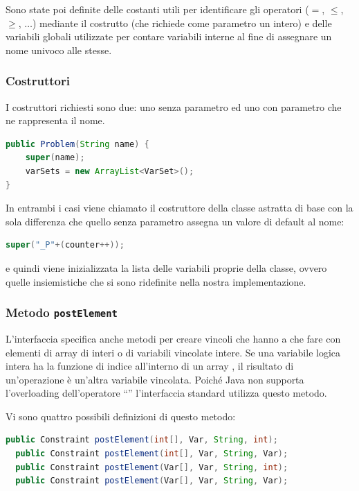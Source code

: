 Sono state poi definite delle costanti utili per identificare gli operatori
($=$, $\leq$, $\geq$, $\ldots$) 
mediante il costrutto  (che richiede come parametro un intero) e
delle variabili globali utilizzate per contare variabili interne al fine di 
assegnare un nome univoco alle stesse.

\subsubsection{Costruttori} 
I costruttori richiesti sono due: uno senza parametro ed uno con parametro
 che ne rappresenta il nome.
\begin{lstlisting}[language = Java,
                   caption = {costruttore con parametro.}]
public Problem(String name) {
	super(name);
	varSets = new ArrayList<VarSet>();
}
\end{lstlisting}

In entrambi i casi viene chiamato il costruttore della classe astratta di base
con la sola differenza che quello senza parametro assegna un valore di
default al nome:
\begin{lstlisting}[language = Java, frame = single]
	super("_P"+(counter++));
\end{lstlisting} 
e quindi viene inizializzata la lista delle variabili proprie della classe, 
ovvero quelle insiemistiche che si sono ridefinite nella nostra implementazione.

\subsubsection{Metodo \texttt{postElement}}
L'interfaccia  specifica anche metodi  per creare vincoli 
che hanno a che fare con elementi di array di interi o di variabili vincolate
intere. Se una variabile logica intera  ha la funzione di
indice all'interno di un array , il risultato di un'operazione
 è un'altra variabile vincolata. Poiché Java
non supporta l'overloading dell'operatore ``\files{[]}'' l'interfaccia
standard utilizza questo metodo.

Vi sono quattro possibili definizioni di questo metodo:
\begin{lstlisting}[language = Java, frame = single]
  public Constraint postElement(int[], Var, String, int);
  public Constraint postElement(int[], Var, String, Var);
  public Constraint postElement(Var[], Var, String, int);
  public Constraint postElement(Var[], Var, String, Var);
\end{lstlisting}

